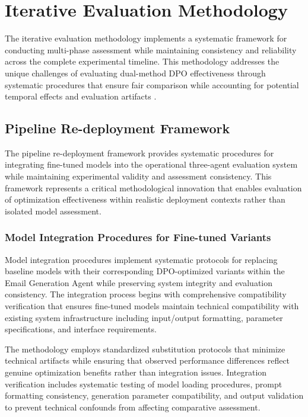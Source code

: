 \section{Iterative Evaluation Methodology}
\label{sec:iterative-evaluation}

The iterative evaluation methodology implements a systematic framework for conducting multi-phase assessment while maintaining consistency and reliability across the complete experimental timeline. This methodology addresses the unique challenges of evaluating dual-method DPO effectiveness through systematic procedures that ensure fair comparison while accounting for potential temporal effects and evaluation artifacts \cite{zhang2024improve_pipeline, xu2024consistency_survey}.

\subsection{Pipeline Re-deployment Framework}

The pipeline re-deployment framework provides systematic procedures for integrating fine-tuned models into the operational three-agent evaluation system while maintaining experimental validity and assessment consistency. This framework represents a critical methodological innovation that enables evaluation of optimization effectiveness within realistic deployment contexts rather than isolated model assessment.

\subsubsection{Model Integration Procedures for Fine-tuned Variants}

Model integration procedures implement systematic protocols for replacing baseline models with their corresponding DPO-optimized variants within the Email Generation Agent while preserving system integrity and evaluation consistency. The integration process begins with comprehensive compatibility verification that ensures fine-tuned models maintain technical compatibility with existing system infrastructure including input/output formatting, parameter specifications, and interface requirements.

The methodology employs standardized substitution protocols that minimize technical artifacts while ensuring that observed performance differences reflect genuine optimization benefits rather than integration issues. Integration verification includes systematic testing of model loading procedures, prompt formatting consistency, generation parameter compatibility, and output validation to prevent technical confounds from affecting comparative assessment.

